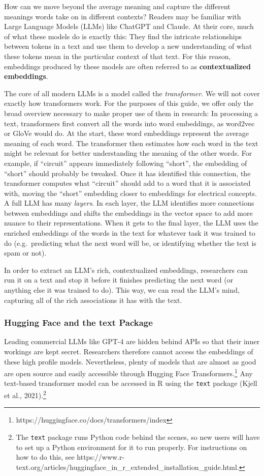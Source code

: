 \documentclass[
  man,
  floatsintext,
  longtable,
  nolmodern,
  notxfonts,
  notimes,
  colorlinks=true,linkcolor=blue,citecolor=blue,urlcolor=blue]{apa7}
\begin{document}
How can we move beyond the average meaning and capture the different
meanings words take on in different contexts? Readers may be familiar
with Large Language Models (LLMs) like ChatGPT and Claude. At their
core, much of what these models do is exactly this: They find the
intricate relationships between tokens in a text and use them to develop
a new understanding of what these tokens mean in the particular context
of that text. For this reason, embeddings produced by these models are
often referred to as \textbf{contextualized embeddings}.

The core of all modern LLMs is a model called the \emph{transformer}. We
will not cover exactly how transformers work. For the purposes of this
guide, we offer only the broad overview necessary to make proper use of
them in research: In processing a text, transformers first convert all
the words into word embeddings, as word2vec or GloVe would do. At the
start, these word embeddings represent the average meaning of each word.
The transformer then estimates how each word in the text might be
relevant for better understanding the meaning of the other words. For
example, if ``circuit'' appears immediately following ``short'', the
embedding of ``short'' should probably be tweaked. Once it has
identified this connection, the transformer computes what ``circuit''
should add to a word that it is associated with, moving the ``short''
embedding closer to embeddings for electrical concepts. A full LLM has
many \emph{layers}. In each layer, the LLM identifies more connections
between embeddings and shifts the embeddings in the vector space to add
more nuance to their representations. When it gets to the final layer,
the LLM uses the enriched embeddings of the words in the text for
whatever task it was trained to do (e.g.~predicting what the next word
will be, or identifying whether the text is spam or not).

In order to extract an LLM's rich, contextualized embeddings,
researchers can run it on a text and stop it before it finishes
predicting the next word (or anything else it was trained to do). This
way, we can read the LLM's mind, capturing all of the rich associations
it has with the text.

\subsubsection{Hugging Face and the text
Package}\label{hugging-face-and-the-text-package}

Leading commercial LLMs like GPT-4 are hidden behind APIs so that their
inner workings are kept secret. Researchers therefore cannot access the
embeddings of these high profile models. Nevertheless, plenty of models
that are almost as good are open source and easily accessible through
Hugging Face Transformers.\footnote{https://huggingface.co/docs/transformers/index}
Any text-based transformer model can be accessed in R using the
\texttt{text} package (Kjell et al., 2021).\footnote{The \texttt{text}
  package runs Python code behind the scenes, so new users will have to
  set up a Python environment for it to run properly. For instructions
  on how to do this, see
  https://www.r-text.org/articles/huggingface\_in\_r\_extended\_installation\_guide.html.}
\end{document}
